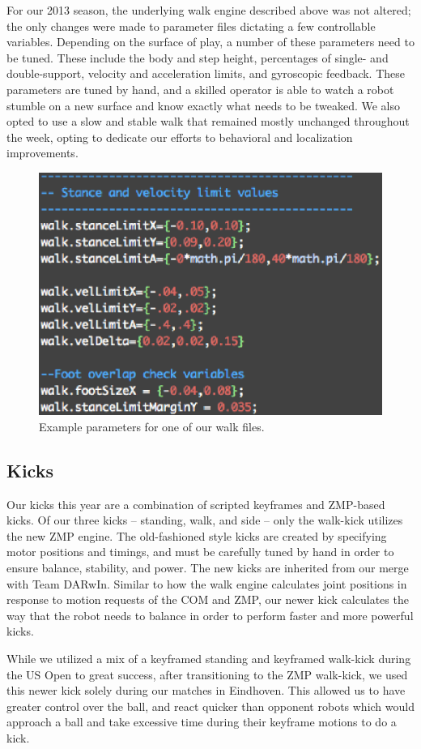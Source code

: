 \documentclass{article}
\begin{document}
	For our 2013 season, the underlying walk engine described above was not altered; the only changes were made to parameter files dictating a few controllable variables. Depending on the surface of play, a number of these parameters need to be tuned. These include the body and step height, percentages of single- and double-support, velocity and acceleration limits, and gyroscopic feedback. These parameters are tuned by hand, and a skilled operator is able to watch a robot stumble on a new surface and know exactly what needs to be tweaked. We also opted to use a slow and stable walk that remained mostly unchanged throughout the week, opting to dedicate our efforts to behavioral and localization improvements.

	\begin{figure}[H]
		\centering
		\includegraphics[width=.60\textwidth]{figures/WalkFile.eps}
		\caption{Example parameters for one of our walk files.}
	\end{figure}

  \subsection{Kicks}
	  Our kicks this year are a combination of scripted keyframes and ZMP-based kicks. Of our three kicks -- standing, walk, and side -- only the walk-kick utilizes the new ZMP engine. The old-fashioned style kicks are created by specifying motor positions and timings, and must be carefully tuned by hand in order to ensure balance, stability, and power. The new kicks are inherited from our merge with Team DARwIn. Similar to how the walk engine calculates joint positions in response to motion requests of the COM and ZMP, our newer kick calculates the way that the robot needs to balance in order to perform faster and more powerful kicks.  

	  While we utilized a mix of a keyframed standing and keyframed walk-kick during the US Open to great success, after transitioning to the ZMP walk-kick, we used this newer kick solely during our matches in Eindhoven. This allowed us to have greater control over the ball, and react quicker than opponent robots which would approach a ball and take excessive time during their keyframe motions to do a kick.
\end{document}
